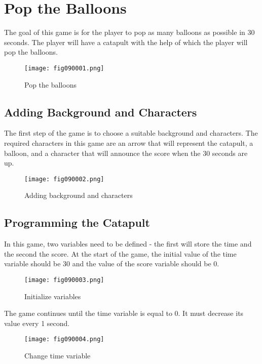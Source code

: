 \chapter{Pop the Balloons}

The goal of this game is for the player to pop as many balloons as possible in 30 seconds. The player will have a catapult with the help of which the player will pop the balloons.

\begin{figure}[H]
   \centering
   \texttt{[image: fig090001.png]}
   \caption{Pop the balloons}
\label{fig090001}
\end{figure}

\section{Adding Background and Characters}
The first step of the game is to choose a suitable background and characters. The required characters in this game are an arrow that will represent the catapult, a balloon, and a character that will announce the score when the 30 seconds are up.

\begin{figure}[H]
   \centering
   \texttt{[image: fig090002.png]}
   \caption{Adding background and characters}
\label{fig090002}
\end{figure}

\section{Programming the Catapult}
In this game, two variables need to be defined - the first will store the time and the second the score. At the start of the game, the initial value of the time variable should be 30 and the value of the score variable should be 0.

\begin{figure}[H]
   \centering
   \texttt{[image: fig090003.png]}
   \caption{Initialize variables}
\label{fig090003}
\end{figure}

The game continues until the time variable is equal to 0. It must decrease its value every 1 second.

\begin{figure}[H]
   \centering
   \texttt{[image: fig090004.png]}
   \caption{Change time variable}
\label{fig090004}
\end{figure}

